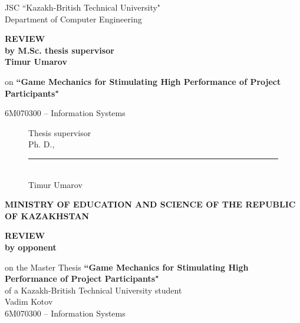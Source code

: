 \begin{titlepage}
\begin{centering}
{		JSC ``Kazakh-British Technical University"\\
		Department of Computer Engineering}
       \vspace{14pt}

		{\bf
		\MakeUppercase{Review}\\
		by M.Sc. thesis supervisor\\
		Timur Umarov
		}

		\vspace{14pt}
		
		on 	{\bf``Game Mechanics for Stimulating High Performance of Project Participants"}
		
		\vspace{14pt}
		
		6M070300 -- Information Systems

	\end{centering}
    
    

		\begin{figure}[ht]
			\begin{minipage}[t]{0.5\linewidth}
				Thesis supervisor\\
				Ph. D.,

				\rule{13em}{0.4pt}\\
				Timur Umarov\\
			\end{minipage}
		\end{figure}
		
		\pagebreak

	\begin{centering}
		{\bf{\MakeUppercase{Ministry of education and science of the republic of Kazakhstan}}}

       \vspace{14pt}

		{\bf
		\MakeUppercase{Review}\\
		by opponent\\
		}

		\vspace{14pt}
		
		on the Master Thesis {\bf``Game Mechanics for Stimulating High Performance of Project Participants"}\\
		of a Kazakh-British Technical University student\\
		 Vadim Kotov\\
		 6M070300 -- Information Systems\\
		
		
		\vspace{14pt}
		


\end{centering}
\end{titlepage}
